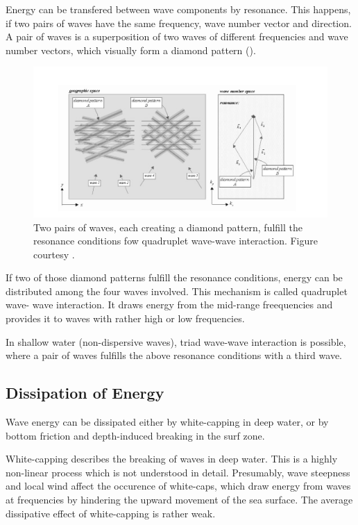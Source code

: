 Energy can be transfered between wave components by resonance. This happens, if 
two pairs of waves have the same frequency, wave number vector and direction. A 
pair of waves is a superposition of two waves of different frequencies and wave 
number vectors, which visually form a diamond pattern ().
\begin{figure}[ht]
 \includegraphics[width=15cm]{bilder/diamond.png}
 \caption{Two pairs of waves, each creating a diamond pattern, fulfill the 
resonance conditions fow quadruplet wave-wave interaction. Figure courtesy 
\cite{holthuijsen2007}. \label{diamond}}
\end{figure}

If two of those diamond patterns fulfill the resonance conditions, energy can 
be distributed among the four waves involved. This mechanism is called 
quadruplet wave- wave interaction. It draws energy from the mid-range 
freequencies and provides it to waves with rather high or low frequencies. 

In shallow water (non-dispersive waves), triad wave-wave interaction is 
possible, where a pair of waves fulfills the above resonance conditions with a 
third wave.

\subsection{Dissipation of Energy}

Wave energy can be dissipated either by white-capping in deep 
water, or by bottom friction and depth-induced breaking in the surf zone. 

White-capping describes the breaking of waves in deep water. This is a 
highly non-linear process which is not understood in detail. Presumably, wave 
steepness and local wind affect the occurence of white-caps, which draw energy 
from waves at frequencies by hindering the upward movement of the sea surface. 
The average dissipative effect of white-capping is rather weak.


